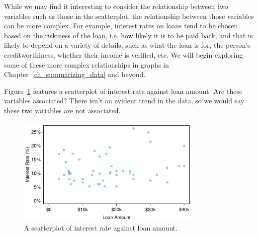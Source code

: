 While we may find it interesting to consider the relationship
between two variables such as those in the scatterplot,
the relationship between those variables can be more complex.
For example, interest rates on loans tend to be chosen based
on the riskiness of the loan, i.e. how likely it is to be
paid back, and that is likely to depend on a variety of
details, such as what the loan is for, the person's
creditworthiness, whether their income is verified, etc.
We will begin exploring some of these more complex relationships
in graphs in Chapter~\ref{ch_summarizing_data} and beyond.

\begin{example}{Figure~\ref{interest_rate_vs_loan_amount}
    features a scatterplot of interest rate against loan amount.
    Are these variables associated?}
  There isn't an evident trend in the data,
  so we would say these two variables are not associated.
\end{example}

\begin{figure}
   \centering
   \includegraphics[width=0.8\textwidth]{ch_intro_to_data/figures/interest_rate_vs_loan_amount/interest_rate_vs_loan_amount}
   \caption{A scatterplot of interest rate against loan amount.}
   \label{interest_rate_vs_loan_amount}
\end{figure}



